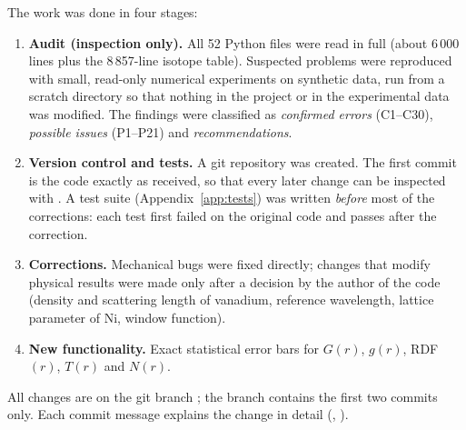 \documentclass[11pt,a4paper]{article}
\begin{document}
The work was done in four stages:
\begin{enumerate}
  \item \textbf{Audit (inspection only).} All 52 Python files were read in
    full (about 6\,000 lines plus the 8\,857-line isotope table). Suspected
    problems were reproduced with small, read-only numerical experiments on
    synthetic data, run from a scratch directory so that nothing in the
    project or in the experimental data was modified. The findings were
    classified as \emph{confirmed errors} (C1--C30), \emph{possible issues}
    (P1--P21) and \emph{recommendations}.
  \item \textbf{Version control and tests.} A git repository was created.
    The first commit is the code exactly as received, so that every later
    change can be inspected with . A test suite (Appendix~\ref{app:tests})
    was written \emph{before} most of the corrections: each test first
    failed on the original code and passes after the correction.
  \item \textbf{Corrections.} Mechanical bugs were fixed directly; changes
    that modify physical results were made only after a decision by the
    author of the code (density and scattering length of vanadium,
    reference wavelength, lattice parameter of Ni, window function).
  \item \textbf{New functionality.} Exact statistical error bars for
    $G(r)$, $g(r)$, RDF$(r)$, $T(r)$ and $N(r)$.
\end{enumerate}


All changes are on the git branch ; the branch
 contains the first two commits only. Each commit message
explains the change in detail (, ).
\end{document}
